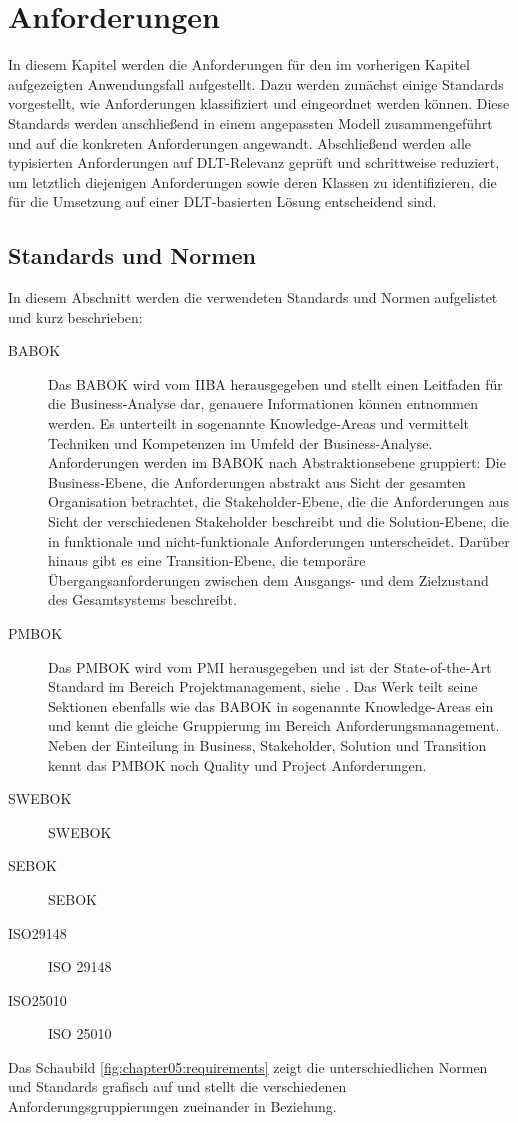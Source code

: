 \chapter{Anforderungen}
\label{ch:requirements}
In diesem Kapitel werden die Anforderungen für den im vorherigen Kapitel aufgezeigten Anwendungsfall aufgestellt. Dazu werden zunächst einige Standards vorgestellt, wie Anforderungen klassifiziert und eingeordnet werden können. Diese Standards werden anschließend in einem angepassten Modell zusammengeführt und auf die konkreten Anforderungen angewandt. Abschließend werden alle typisierten Anforderungen auf \ac{DLT}-Relevanz geprüft und schrittweise reduziert, um letztlich diejenigen Anforderungen sowie deren Klassen zu identifizieren, die für die Umsetzung auf einer \ac{DLT}-basierten Lösung entscheidend sind.

%
%
\section{Standards und Normen}
\label{sec:requirements:standards}
In diesem Abschnitt werden die verwendeten Standards und Normen aufgelistet und kurz beschrieben:
\begin{description}
  \item[BABOK] Das \ac{BABOK} wird vom \ac{IIBA} herausgegeben und stellt einen Leitfaden für die Business-Analyse dar, genauere Informationen können \cite{BABOK} entnommen werden. Es unterteilt in sogenannte Knowledge-Areas und vermittelt Techniken und Kompetenzen im Umfeld der Business-Analyse. Anforderungen werden im \ac{BABOK} nach Abstraktionsebene gruppiert: Die Business-Ebene, die Anforderungen abstrakt aus Sicht der gesamten Organisation betrachtet, die Stakeholder-Ebene, die die Anforderungen aus Sicht der verschiedenen Stakeholder beschreibt und die Solution-Ebene, die in funktionale und nicht-funktionale Anforderungen unterscheidet. Darüber hinaus gibt es eine Transition-Ebene, die temporäre Übergangsanforderungen zwischen dem Ausgangs- und dem Zielzustand des Gesamtsystems beschreibt.
  \item[PMBOK]  Das \ac{PMBOK} wird vom \ac{PMI} herausgegeben und ist der State-of-the-Art Standard im Bereich Projektmanagement, siehe \cite{PMBOK}. Das Werk teilt seine Sektionen ebenfalls wie das \ac{BABOK} in sogenannte Knowledge-Areas ein und kennt die gleiche Gruppierung im Bereich Anforderungsmanagement. Neben der Einteilung in Business, Stakeholder, Solution und Transition kennt das \ac{PMBOK} noch Quality und Project Anforderungen.
  \item[SWEBOK] \cite{SWEBOK} \ac{SWEBOK}
  \item[SEBOK] \cite{SEBOK} \ac{SEBOK}
  \item[ISO29148] \cite{ISO29148} \ac{ISO} 29148
  \item[ISO25010] \cite{ISO25010} \ac{ISO} 25010
\end{description}
Das Schaubild \ref{fig:chapter05:requirements} zeigt die unterschiedlichen Normen und Standards grafisch auf und stellt die verschiedenen Anforderungsgruppierungen zueinander in Beziehung.

